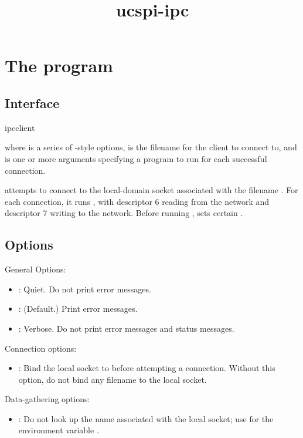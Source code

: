 \documentclass{book}
\title{ucspi-ipc}
\begin{document}
\section{The  program}

\subsection{Interface}
\begin{code}%
  ipcclient   
\end{code}
where  is a series of -style options,
 is the filename for the client to connect to, and
 is one or more arguments specifying a program to run for
each successful connection.

 attempts to connect to the local-domain socket
associated with the filename .  For each connection, it runs
, with descriptor 6 reading from the network and descriptor
7 writing to the network.  Before running , 
sets certain .

\subsection{Options}
General Options:
\begin{itemize}
\item {}: Quiet.  Do not print error messages.
\item {}: (Default.)  Print error messages.
\item {}: Verbose.  Do not print error messages and status messages.
\end{itemize}

Connection options:
\begin{itemize}
\item {}: Bind the local socket to
   before attempting a connection.  Without this
  option, do not bind any filename to the local socket.
\end{itemize}

Data-gathering options:
\begin{itemize}
\item {}: Do not look up the name associated
  with the local socket; use  for the environment
  variable .
\end{itemize}
\end{document}

